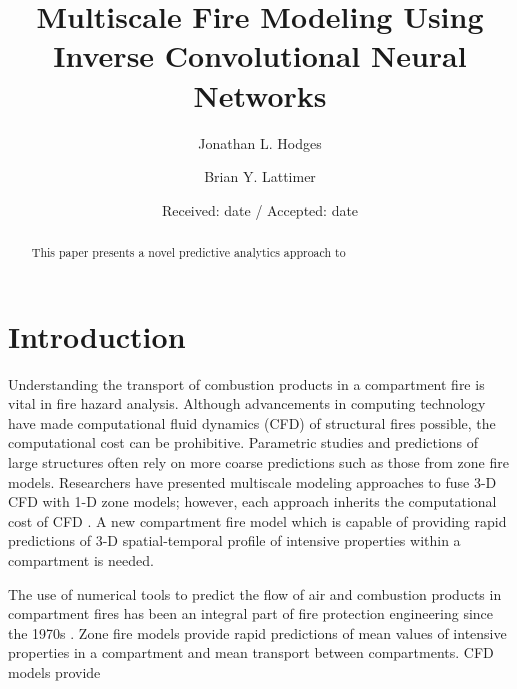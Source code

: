 \documentclass[smallcondensed]{svjour3}     %
\begin{document}
\title{Multiscale Fire Modeling Using Inverse Convolutional Neural Networks
}

\author{Jonathan L. Hodges         \and
        Brian Y. Lattimer
}


\date{Received: date / Accepted: date}


\maketitle

\begin{abstract}
This paper presents a novel predictive analytics approach to 


\end{abstract}




\section{Introduction}
\label{intro}

Understanding the transport of combustion products in a compartment fire is
vital in fire hazard analysis. Although advancements in computing technology
have made computational fluid dynamics (CFD) of structural fires possible,
the computational cost can be prohibitive. Parametric studies and predictions of
large structures often rely on more coarse predictions such as those from zone
fire models. Researchers have presented multiscale modeling approaches to fuse
3-D CFD with 1-D zone models; however, each approach inherits the computational
cost of CFD \cite{wang2008applications,nobile2009coupling,choi2011multiscale,colella2011novel,kuprat2013bidirectional,haghighat2018development}.
A new compartment fire model which is capable of providing rapid
predictions of 3-D spatial-temporal profile of intensive properties within a
compartment is needed.


The use of numerical tools to predict the flow of air and combustion products
in compartment fires has been an integral part of fire protection engineering
since the 1970s \cite{quintiere1976growth}. 
Zone fire models provide rapid predictions of mean values of intensive
properties in a compartment and mean transport between compartments. CFD models
provide 
\end{document}
